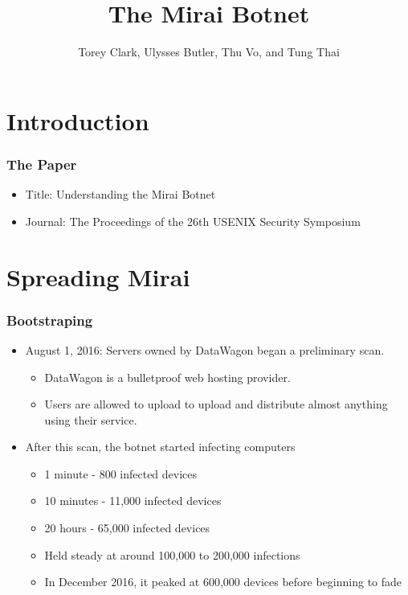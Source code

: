 \documentclass{beamer}
\title{The Mirai Botnet}
\author{Torey Clark, Ulysses Butler, Thu Vo, and Tung Thai}
\institute{ Truman State University \\ Binary Beasts }
\date{}
\begin{document}
\maketitle

\section{Introduction}

\begin{frame}
	\frametitle{The Paper}
	\begin{itemize}
		\item<+-> Title: Understanding the Mirai Botnet
		\item<+-> Journal: The Proceedings of the 26th USENIX Security Symposium
	\end{itemize}
\end{frame}

\section{Spreading Mirai}

\begin{frame}
	\frametitle{Bootstraping}
	\begin{itemize}
		\item<+-> August 1, 2016: Servers owned by DataWagon began a preliminary scan.
		\begin{itemize}
			\item<+-> DataWagon is a bulletproof web hosting provider.
			\item<+-> Users are allowed to upload to upload and distribute almost anything using their service.
		\end{itemize}
		\item<+-> After this scan, the botnet started infecting computers
		\begin{itemize}
			\item<+-> 1 minute -  800 infected devices
			\item<+-> 10 minutes - 11,000 infected devices
			\item<+-> 20 hours - 65,000 infected devices
			\item<+-> Held steady at around 100,000 to 200,000 infections
			\item<+-> In December 2016, it peaked at 600,000 devices before beginning to fade
		\end{itemize}
	\end{itemize}
\end{frame}
\end{document}
